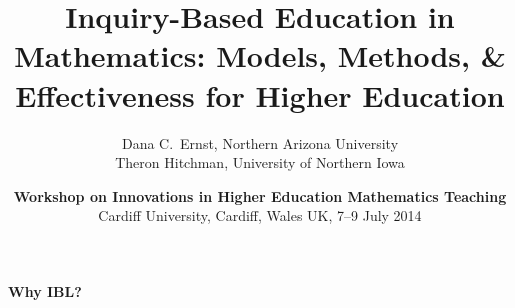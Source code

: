 \documentclass[9pt,handout]{beamer}
\begin{document}

\title[Inquiry-Based Education in Mathematics]
{\textbf{Inquiry-Based Education in Mathematics: Models, Methods, \& Effectiveness for Higher Education}}
\author[D.C.~Ernst and TJ Hitchman]{Dana C.~Ernst, Northern Arizona University\\
Theron Hitchman, University of Northern Iowa}

\vspace{1em}

\date{\textbf{Workshop on Innovations in Higher Education Mathematics Teaching}\\
Cardiff University, Cardiff, Wales UK, 7--9 July 2014}

\frame{\titlepage}


\begin{frame}

\vspace{1cm}

\begin{center}
{\Huge \textbf{Why IBL?}}
\end{center}

\end{frame}




\end{document}
